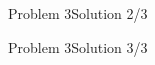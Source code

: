 \begin{frame}[fragile]{Problem 3}{Solution 2/3}

\end{frame}

\begin{frame}[fragile]{Problem 3}{Solution 3/3}

\end{frame}

% 

% 
% 
% 
% 
% 
% 
% 
